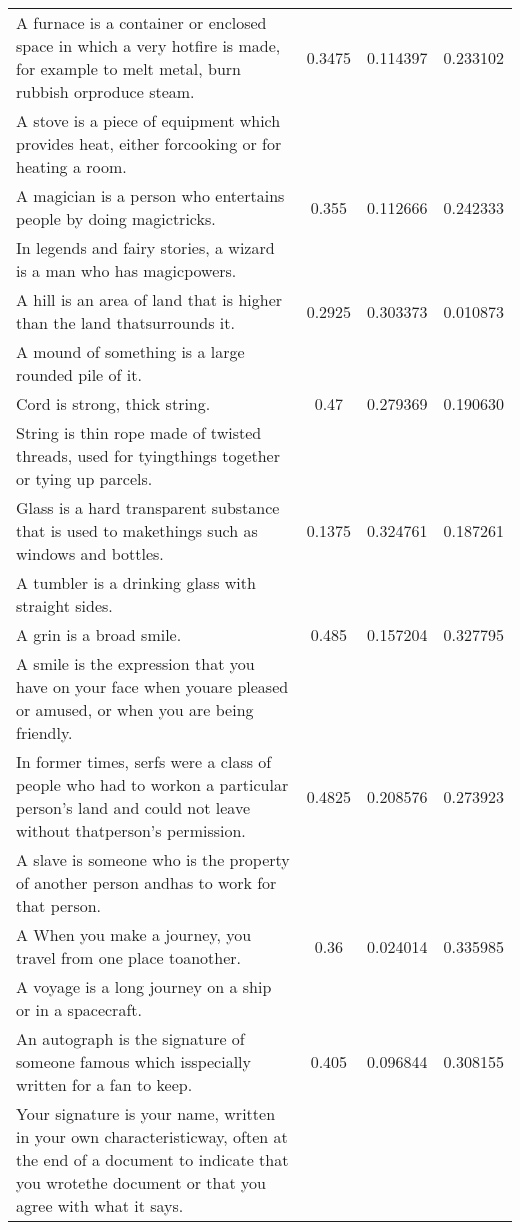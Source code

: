 \begin{center}
{\begin{longtable}{|p{9cm}|c|c|c|}
\hline
A furnace is a container or enclosed space in which a very hotfire is made, for example to melt metal, burn rubbish orproduce steam. & 0.3475 & 0.114397 & 0.233102 \\
A stove is a piece of equipment which provides heat, either forcooking or for heating a room. & & & \\
\hline
A magician is a person who entertains people by doing magictricks. & 0.355 & 0.112666 & 0.242333 \\
In legends and fairy stories, a wizard is a man who has magicpowers. & & & \\
\hline
A hill is an area of land that is higher than the land thatsurrounds it. & 0.2925 & 0.303373 & 0.010873 \\
A mound of something is a large rounded pile of it. & & & \\
\hline
Cord is strong, thick string. & 0.47 & 0.279369 & 0.190630 \\
String is thin rope made of twisted threads, used for tyingthings together or tying up parcels. & & & \\
\hline
Glass is a hard transparent substance that is used to makethings such as windows and bottles. & 0.1375 & 0.324761 & 0.187261 \\
A tumbler is a drinking glass with straight sides. & & & \\
\hline
A grin is a broad smile. & 0.485 & 0.157204 & 0.327795 \\
A smile is the expression that you have on your face when youare pleased or amused, or when you are being friendly. & & & \\
\hline
In former times, serfs were a class of people who had to workon a particular person's land and could not leave without thatperson's permission. & 0.4825 & 0.208576 & 0.273923 \\
A slave is someone who is the property of another person andhas to work for that person. & & & \\
\hline
A When you make a journey, you travel from one place toanother. & 0.36 & 0.024014 & 0.335985 \\
A voyage is a long journey on a ship or in a spacecraft. & & & \\
\hline
An autograph is the signature of someone famous which isspecially written for a fan to keep. & 0.405 & 0.096844 & 0.308155 \\
Your signature is your name, written in your own characteristicway, often at the end of a document to indicate that you wrotethe document or that you agree with what it says. & & & \\

\end{longtable}}
\end{center}
